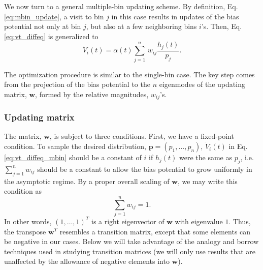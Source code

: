 \documentclass[reprint, superscriptaddress, floatfix]{revtex4-1}
\begin{document}
We now turn to a general multiple-bin updating scheme.
%
By definition, Eq. \eqref{eq:mbin_update},
a visit to bin $j$ in this case results in updates of the bias potential
not only at bin $j$, but also at a few neighboring bins $i$'s.
%
Then, Eq. \eqref{eq:vt_diffeq} is generalized to
%
\begin{equation}
  \dot V_i(t)
  =
  \alpha(t) \sum_{j=1}^n \, w_{ij} \frac{ h_j(t) } { p_j }.
  \label{eq:vt_diffeq_mbin}
\end{equation}


The optimization procedure is similar to the single-bin case.
%
The key step comes from the
projection of the bias potential to the $n$ eigenmodes
of the updating matrix, $\mathbf w$,
formed by the relative magnitudes, $w_{ij}$'s.
%



\subsubsection{\label{sec:updating-matrix}
Updating matrix}



The matrix, $\mathbf w$, is subject to three conditions.
%
First, we have a fixed-point condition\cite{bussi2006, dama2014}.
%
To sample the desired distribution,
$\mathbf p = (p_1, \dots, p_n)$,
${\dot V}_i(t)$
in Eq. \eqref{eq:vt_diffeq_mbin}
should be a constant of $i$
if $h_j(t)$ were the same as $p_j$,
i.e.
$\sum_{j=1}^n w_{ij}$ should be a constant
to allow the bias potential to grow uniformly
in the asymptotic regime.
%
By a proper overall scaling of $\mathbf w$,
we may write this condition as
%
\begin{equation}
  \sum_{j = 1}^n w_{ij} = 1
  .
\label{eq:w_sumj}
\end{equation}
%
In other words, $(1, \dots, 1)^T$
is a right eigenvector of $\mathbf w$
with eigenvalue $1$.
%
Thus, the transpose $\mathbf w^T$
resembles a transition matrix,
except that some elements can be negative
in our cases.
%
Below we will take advantage of the analogy
and borrow techniques used
in studying transition matrices\cite{vankampen}
(we will only use results that are unaffected by the allowance
of negative elements into $\mathbf w$).
\end{document}
